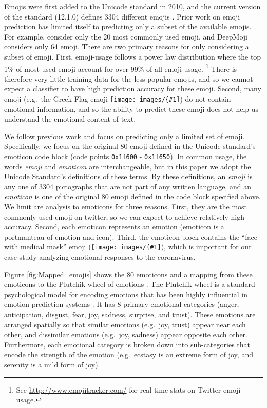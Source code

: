 \documentclass[11pt]{article}
\newcommand{\defn}[1]{\emph{{#1}}}
\newcommand{\emoji}[1]{\texttt{[image: images/\{\#1]}}}
\begin{document}
Emojis were first added to the Unicode standard in 2010,
and the current version of the standard (12.1.0) defines 3304 different emojis \citep{unicode12}.
Prior work on emoji prediction has limited itself to predicting only a subset of the available emojis.
For example, \citet{barbieri2017emojis} consider only the 20 most commonly used emoji,
and DeepMoji \citep{felbo2017using} considers only 64 emoji.
There are two primary reasons for only considering a subset of emoji.
First, emoji-usage follows a power law distribution where the top 1\% of most used emoji account for over 99\% of all emoji usage.%
\footnote{
    See \url{http://www.emojitracker.com/} for real-time stats on Twitter emoji usage.
}
There is therefore very little training data for the less popular emojis,
and so we cannot expect a classifier to have high prediction accuracy for these emoji.
Second, many emoji (e.g.\ the Greek Flag emoji \emoji{flag-greece_1f1ec-1f1f7}) do not contain emotional information,
and so the ability to predict these emoji does not help us understand the emotional content of text.

We follow previous work and focus on predicting only a limited set of emoji.
Specifically, we focus on the original 80 emoji defined in the Unicode standard's emoticon code block (code points \texttt{0x1f600} - \texttt{0x1f650}). %
    In common usage, the words \defn{emoji} and \defn{emoticon} are interchangeable,
    but in this paper we adopt the Unicode Standard's definitions of these terms.
    By these definitions, an \defn{emoji} is any one of 3304 pictographs that are not part of any written language,
    and an \defn{emoticon} is one of the original 80 emoji defined in the code block specified above.
We limit are analysis to emoticons for three reasons.
First, they are the most commonly used emoji on twitter,
so we can expect to achieve relatively high accuracy.
Second, each emoticon represents an emotion (emoticon is a portmanteau of emotion and icon).
Third, the emoticon block contains the ``face with medical mask'' emoji (\emoji{mask_photo.png}),
which is important for our case study analyzing emotional responses to the coronavirus.

Figure \ref{fig:Mapped_emojis} shows the 80 emoticons and a mapping from these emoticons to the Plutchik wheel of emotions \citep{plutchik1991emotions}.
The Plutchik wheel is a standard psychological model for encoding emotions that has been highly influential in emotion prediction systems \citep[e.g.][]{suttles2013distant,kant2018practical,liu2019dens}.
It has 8 primary emotional categories (anger, anticipation, disgust, fear, joy, sadness, surprise, and trust).
These emotions are arranged spatially so that similar emotions (e.g.\ joy, trust) appear near each other, and dissimilar emotions (e.g.\ joy, sadness) appear opposite each other.
Furthermore, each emotional category is broken down into sub-categories that encode the strength of the emotion (e.g.\ ecstasy is an extreme form of joy, and serenity is a mild form of joy).
\end{document}

